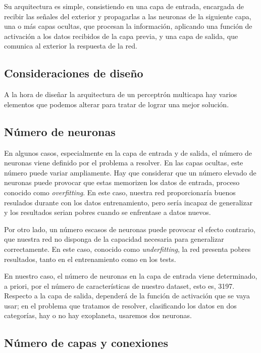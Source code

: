 Su arquitectura es simple, consistiendo en una capa de entrada,
encargada de recibir las señales del exterior y propagarlas a las
neuronas de la siguiente capa, una o más capas ocultas, que procesan la
información, aplicando una función de activación a los datos recibidos
de la capa previa, y una capa de salida, que comunica al exterior la
respuesta de la red.


\subsection{Consideraciones de diseño}\label{consideraciones-de-diseno}

A la hora de diseñar la arquitectura de un perceptrón multicapa hay
varios elementos que podemos alterar para tratar de lograr una mejor
solución.

\subsection{Número de neuronas}\label{numero-de-neuronas}

En algunos casos, especialmente en la capa de entrada y de salida, el
número de neuronas viene definido por el problema a resolver. En las
capas ocultas, este número puede variar ampliamente. Hay que considerar
que un número elevado de neuronas puede provocar que estas memorizen los
datos de entrada, proceso conocido como \emph{overfitting}. En este
caso, nuestra red proporcionaría buenos resulados durante con los datos
entrenamiento, pero sería incapaz de generalizar y los resultados serian
pobres cuando se enfrentase a datos nuevos.

Por otro lado, un número escasos de neuronas puede provocar el efecto
contrario, que nuestra red no disponga de la capacidad necesaria para
generalizar correctamente. En este caso, conocido como
\emph{underfitting}, la red presenta pobres resultados, tanto en el
entrenamiento como en los tests.

En nuestro caso, el número de neuronas en la capa de entrada viene
determinado, a priori, por el número de características de nuestro
dataset, esto es, 3197. Respecto a la capa de salida, dependerá de la
función de activación que se vaya usar; en el problema que tratamos de
resolver, clasificando los datos en dos categorías, hay o no hay
exoplaneta, usaremos dos neuronas.

\subsection{Número de capas y conexiones}\label{numero-de-capas-y-conexiones}

